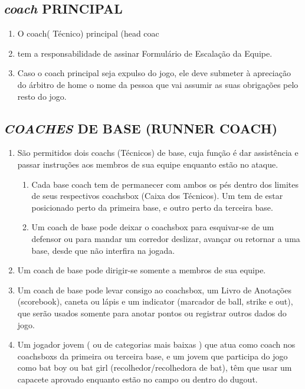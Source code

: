 \subsection{\textit{coach} PRINCIPAL}

\begin{enumerate}[label=(\alph*)]
	\item O \gls{coach}( Técnico) principal (head coac\item  tem a responsabilidade de assinar Formulário de Escalação da Equipe.
	\item Caso o \gls{coach} principal seja expulso do jogo, ele deve submeter à apreciação do árbitro de \gls{home} o nome da pessoa que vai assumir as suas obrigações pelo resto do jogo.
\end{enumerate}

\subsection{\textit{COACHES} DE BASE (RUNNER COACH)}

\begin{enumerate}[label=(\alph*)]\item   São permitidos dois \glspl{coach} (Técnicos) de base, cuja função é dar assistência e passar instruções aos membros de sua equipe enquanto estão no ataque.
	\begin{enumerate}[label=\roman*.]
		\item Cada \gls{base coach} tem de permanecer com ambos os pés dentro dos limites de seus respectivos \gls{coachsbox} (Caixa dos Técnicos). Um tem de estar posicionado perto da primeira base, e outro perto da terceira base.
		\item Um \gls{coach} de base pode deixar o \gls{coachsbox} para esquivar-se de um defensor ou para mandar um corredor deslizar, avançar ou retornar a uma base, desde que não interfira na jogada.
	\end{enumerate}
	\item Um \gls{coach} de base pode dirigir-se somente a membros de sua equipe.
	\item Um \gls{coach} de base pode levar consigo ao \gls{coachsbox}, um Livro de Anotações (\gls{scorebook}), caneta ou lápis e um \gls{indicator} (marcador de \gls{ball}, \gls{strike} e \gls{out}), que serão usados somente para anotar pontos ou registrar outros dados do jogo.
	\item Um jogador jovem ( ou de categorias mais baixas ) que atua como \gls{coach} nos \glspl{coachsbox} da primeira ou terceira base, e um jovem que participa do jogo como \gls{bat boy} ou \gls{bat girl} (recolhedor/recolhedora de \gls{bat}), têm que usar um capacete aprovado enquanto estão no campo ou dentro do \gls{dugout}.
\end{enumerate}

